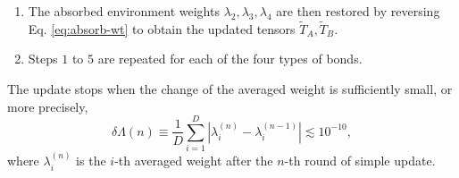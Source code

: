 \documentclass[11pt]{article}
\begin{document}
\begin{enumerate}
    \item The absorbed environment weights $\lambda_2, \lambda_3, \lambda_4$ are then restored by reversing Eq. \eqref{eq:absorb-wt} to obtain the updated tensors $\tilde{T}_A, \tilde{T}_B$. 

    \item Steps $1$ to $5$ are repeated for each of the four types of bonds. 
\end{enumerate}
\endgroup

The update stops when the change of the averaged weight is sufficiently small, or more precisely,
\begin{equation}
    \delta \Lambda(n)
    \equiv \frac{1}{D} \sum_{i=1}^D |
        \lambda^{(n)}_i
        - \lambda^{(n-1)}_i
    | \lesssim 10^{-10},
\end{equation}
where $\lambda^{(n)}_i$ is the $i$-th averaged weight after the $n$-th round of simple update.
\end{document}
